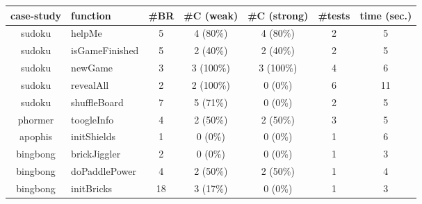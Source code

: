   \scriptsize
    \begin{tabular}{c|l|c|c|c|c|c}
      \toprule
      \textbf{case-study} & \textbf{function} & \textbf{\#BR} & \textbf{\#C (weak)} & \textbf{\#C (strong)} & \textbf{\#tests} & \textbf{time (sec.)} \\
      \hline
      sudoku & helpMe          & 5  & 4 (80\%)  & 4 (80\%)  & 2 & 5 \\
      sudoku & isGameFinished  & 5  & 2 (40\%)  & 2 (40\%)  & 2 & 5 \\
      sudoku & newGame         & 3  & 3 (100\%) & 3 (100\%) & 4 & 6 \\
      sudoku & revealAll       & 2  & 2 (100\%) & 0 (0\%)   & 6 & 11 \\
      sudoku & shuffleBoard    & 7  & 5 (71\%)  & 0 (0\%)   & 2 & 5  \\
      \hline
      phormer & toogleInfo     & 4  & 2 (50\%)  & 2 (50\%)  & 3 & 5 \\
      \hline
      apophis & initShields    & 1  & 0 (0\%)   & 0 (0\%)   & 1 & 6 \\
      \hline
      bingbong & brickJiggler  & 2  & 0 (0\%)   & 0 (0\%)   & 1  & 3 \\
      bingbong & doPaddlePower & 4  & 2 (50\%)  & 2 (50\%)  & 1  & 4 \\
      bingbong & initBricks    & 18 & 3 (17\%)  & 0 (0\%) & 1  & 3 \\
      \bottomrule
    \end{tabular}
